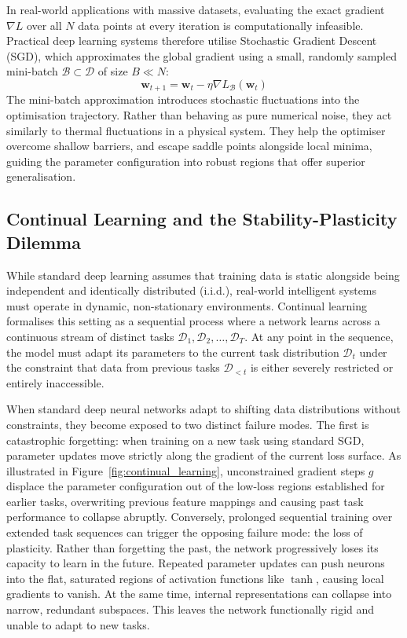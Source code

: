 \documentclass[11pt,oneside]{report}
\begin{document}
In real-world applications with massive datasets, evaluating the exact gradient $\nabla L$ over all $N$ data points at every iteration is computationally infeasible. Practical deep learning systems therefore utilise Stochastic Gradient Descent (SGD), which approximates the global gradient using a small, randomly sampled mini-batch $\mathcal{B} \subset \mathcal{D}$ of size $B \ll N$:
\begin{equation}
	\mathbf{w}_{t+1} = \mathbf{w}_t - \eta \nabla L_{\mathcal{B}}(\mathbf{w}_t)
\end{equation}
The mini-batch approximation introduces stochastic fluctuations into the optimisation trajectory. Rather than behaving as pure numerical noise, they act similarly to thermal fluctuations in a physical system. They help the optimiser overcome shallow barriers, and escape saddle points alongside local minima, guiding the parameter configuration into robust regions that offer superior generalisation.
\subsection{Continual Learning and the Stability-Plasticity Dilemma}
While standard deep learning assumes that training data is static alongside being independent and identically distributed (i.i.d.), real-world intelligent systems must operate in dynamic, non-stationary environments. Continual learning formalises this setting as a sequential process where a network learns across a continuous stream of distinct tasks $\mathcal{D}_1, \mathcal{D}_2, \dots, \mathcal{D}_T$. At any point in the sequence, the model must adapt its parameters to the current task distribution $\mathcal{D}_t$ under the constraint that data from previous tasks $\mathcal{D}_{<t}$ is either severely restricted or entirely inaccessible.

When standard deep neural networks adapt to shifting data distributions without constraints, they become exposed to two distinct failure modes. The first is catastrophic forgetting: when training on a new task using standard SGD, parameter updates move strictly along the gradient of the current loss surface. As illustrated in Figure~\ref{fig:continual_learning}, unconstrained gradient steps $g$ displace the parameter configuration out of the low-loss regions established for earlier tasks, overwriting previous feature mappings and causing past task performance to collapse abruptly. Conversely, prolonged sequential training over extended task sequences can trigger the opposing failure mode: the loss of plasticity. Rather than forgetting the past, the network progressively loses its capacity to learn in the future. Repeated parameter updates can push neurons into the flat, saturated regions of activation functions like $\tanh$, causing local gradients to vanish. At the same time, internal representations can collapse into narrow, redundant subspaces. This leaves the network functionally rigid and unable to adapt to new tasks.  
\end{document}
